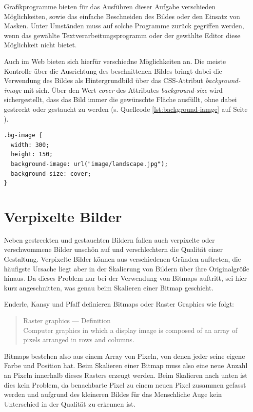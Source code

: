 Grafikprogramme bieten für das Ausführen dieser Aufgabe verschieden Möglichkeiten, sowie das einfache Beschneiden des Bildes oder den Einsatz von Masken. Unter Umständen muss auf solche Programme zurück gegriffen werden, wenn das gewählte Textverarbeitungsprogramm oder der gewählte Editor diese Möglichkeit nicht bietet.

Auch im Web bieten sich hierfür verschiedne Möglichkeiten an. Die meiste Kontrolle über die Ausrichtung des beschnittenen Bildes bringt dabei die Verwendung des Bildes als Hintergrundbild über das CSS-Attribut \textit{background-image} mit sich. Über den Wert \textit{cover} des Attributes \textit{background-size} wird sichergestellt, dass das Bild immer die gewünschte Fläche ausfüllt, ohne dabei gestreckt oder gestaucht zu werden (s. Quellcode \ref{lst:background-iamge} auf Seite \pageref{lst:background-iamge}).

\begin{lstlisting}[caption={Verwendung eines Hintergrundbildes in CSS},label={lst:background-iamge}]
.bg-image {
  width: 300;
  height: 150;
  background-image: url("image/landscape.jpg");
  background-size: cover;
}
\end{lstlisting}

\section{Verpixelte Bilder}
Neben gestreckten und gestauchten Bildern fallen auch verpixelte oder verschwommene Bilder unschön auf und verschlechtern die Qualität einer Gestaltung. Verpixelte Bilder können aus verschiedenen Gründen auftreten, die häufigste Ursache liegt aber in der Skalierung von Bildern über ihre Originalgröße hinaus. 
Da dieses Problem nur bei der Verwendung von Bitmaps auftritt, sei hier kurz angeschnitten, was genau beim Skalieren einer Bitmap geschieht.

Enderle, Kansy und Pfaff definieren Bitmaps oder Raster Graphics wie folgt:

\begin{quote}
Raster graphics — Definition \\
Computer graphics in which a display image is composed of an array of pixels arranged in rows and columns. \cite{enderle2012computer}
\end{quote}

Bitmaps bestehen also aus einem Array von Pixeln, von denen jeder seine eigene Farbe und Position hat.
Beim Skalieren einer Bitmap muss also eine neue Anzahl an Pixeln innerhalb dieses Rasters erzeugt werden. Beim Skalieren nach unten ist dies kein Problem, da benachbarte Pixel zu einem neuen Pixel zusammen gefasst werden und aufgrund des kleineren Bildes für das Menschliche Auge kein Unterschied in der Qualität zu erkennen ist.

